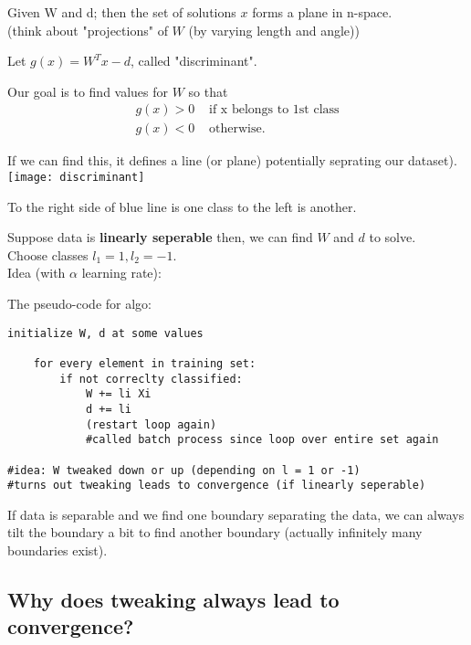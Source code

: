 \documentclass[12pt]{article}
\newcommand{\bt}[1]{\textbf{#1}} %
\newcommand{\eq}[1]{\begin{align*}#1\end{align*}} %
\newcommand{\eq}[1]{\begin{align*}#1\end{align*}} %
\begin{document}
Given W and d; then the set of solutions $x$ forms a plane in n-space. \\
(think about "projections" of $W$ (by varying length and angle))

Let $g(x) = W^Tx - d$, called "discriminant". 

Our goal is to find values for $W$ so that 
\eq{g(x) > 0 & \text{ if x belongs to 1st class}\\
g(x) < 0 & \text{ otherwise}.
}

If we can find this, it defines a line (or plane) potentially seprating our dataset).\\
\texttt{[image: discriminant]}

To the right side of blue line is one class to the left is another.

Suppose data is \bt{linearly seperable} then, we can find $W$ and $d$ to solve.\\

Choose classes $l_1 = 1, l_2 = -1$.\\

Idea (with $\alpha$ learning rate): 



The pseudo-code for algo:

\begin{verbatim}
initialize W, d at some values 

    for every element in training set: 
        if not correclty classified:
            W += li Xi 
            d += li
            (restart loop again)
            #called batch process since loop over entire set again

#idea: W tweaked down or up (depending on l = 1 or -1)
#turns out tweaking leads to convergence (if linearly seperable)
\end{verbatim}

If data is separable and we find one boundary separating the data, we can always tilt the boundary a bit to find another boundary (actually infinitely many boundaries exist).

\subsection*{Why does tweaking always lead to convergence?}
\end{document}
